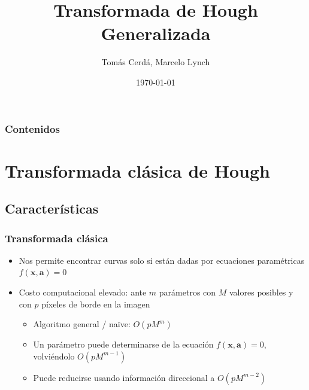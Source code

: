 \documentclass{beamer}
\title[Transformada de Hough Generalizada]{Transformada de Hough Generalizada} %
\author{Tomás Cerdá, Marcelo Lynch} %
\institute[ITBA] %
{
Análisis y Tratamiento de Imágenes \\
Instituto Tecnológico de Buenos Aires \\ %
\medskip
}
\date{\today} %
\begin{document}
\begin{frame}
\titlepage %
\end{frame}

\begin{frame}
\frametitle{Contenidos} %
\tableofcontents %
\end{frame}


\section{Transformada clásica de Hough} %

\subsection{Características} %

\begin{frame}
\frametitle{Transformada clásica}
\begin{itemize}
\item Nos permite encontrar curvas solo si están dadas por ecuaciones paramétricas $f(\textbf{x},\textbf{a}) = 0$
\item Costo computacional elevado: ante $m$ parámetros con $M$ valores posibles y con $p$ píxeles de borde en la imagen
  \begin{itemize}
     \item Algoritmo general / naïve: $O(pM^m)$
     \item Un parámetro puede determinarse de la ecuación $f(\textbf{x},\textbf{a}) = 0$, volviéndolo $O(pM^{m-1})$
     \item Puede reducirse usando información direccional a $O(pM^{m-2})$
   \end{itemize}
\end{itemize}
\end{frame}
\end{document}
